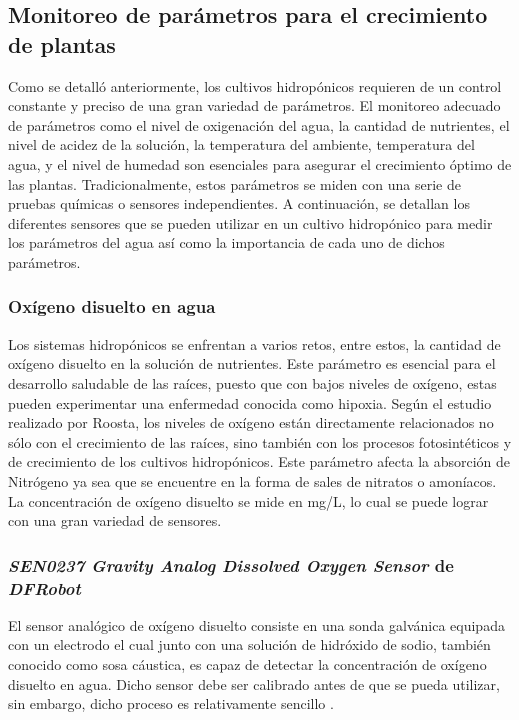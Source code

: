 \subsection*{Monitoreo de parámetros para el crecimiento de plantas}
Como se detalló anteriormente, los cultivos hidropónicos requieren de un control constante y preciso de una gran variedad de parámetros. El monitoreo adecuado de parámetros como el nivel de oxigenación del agua, la cantidad de nutrientes, el nivel de acidez de la solución, la temperatura del ambiente, temperatura del agua, y el nivel de humedad son esenciales para asegurar el crecimiento óptimo de las plantas. Tradicionalmente, estos parámetros se miden con una serie de pruebas químicas o sensores independientes. A continuación, se detallan los diferentes sensores que se pueden utilizar en un cultivo hidropónico para medir los parámetros del agua así como la importancia de cada uno de dichos parámetros.

\subsubsection*{Oxígeno disuelto en agua}
Los sistemas hidropónicos se enfrentan a varios retos, entre estos, la cantidad de oxígeno disuelto en la solución de nutrientes. Este parámetro es esencial para el desarrollo saludable de las raíces, puesto que con bajos niveles de oxígeno, estas pueden experimentar una enfermedad conocida como hipoxia. Según el estudio realizado por Roosta, los niveles de oxígeno están directamente relacionados no sólo con el crecimiento de las raíces, sino también con los procesos fotosintéticos y de crecimiento de los cultivos hidropónicos. Este parámetro afecta la absorción de Nitrógeno ya sea que se encuentre en la forma de sales de nitratos o amoníacos\cite{roosta_responses_2024}. La concentración de oxígeno disuelto se mide en mg/L, lo cual se puede lograr con una gran variedad de sensores.

\subsubsection*{\textit{SEN0237 Gravity Analog Dissolved Oxygen Sensor} de \textit{DFRobot}}
El sensor analógico de oxígeno disuelto consiste en una sonda galvánica equipada con un electrodo el cual junto con una solución de hidróxido de sodio, también conocido como sosa cáustica, es capaz de detectar la concentración de oxígeno disuelto en agua. Dicho sensor debe ser calibrado antes de que se pueda utilizar, sin embargo, dicho proceso es relativamente sencillo \cite{DFRobot_DOsensor}. 

